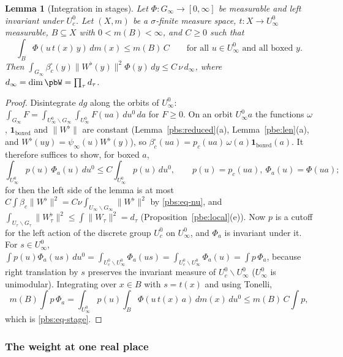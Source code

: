 \documentclass[10pt]{amsart}
\newtheorem{lemma}[theorem]{Lemma}
\theoremstyle{definition}
\theoremstyle{remark}
\begin{document}
\begin{lemma}[Integration in stages]\label{pbs:stages}
Let $\Phi\colon G_\infty\to[0,\infty]$ be measurable and left invariant under $U^0_c$. Let $(X,m)$
be a $\sigma$-finite measure space, $t\colon X\to U^0_\infty$ measurable, $B\subseteq X$ with $0<
m(B)<\infty$, and $C\ge0$ such that
\[
\int_B\Phi(u\,t(x)\,y)\,dm(x)\le m(B)\,C\qquad\text{for all }u\in U^0_\infty\text{ and all boxed }y.
\]
Then $\int_{G_\infty}\beta^\square_c(y)\|W^\flat(y)\|^2\Phi(y)\,dy\le C\,\nu\,d_\infty$, where $d_\infty=
\dim\pbW=\prod_\tau d_\tau$.
\end{lemma}
\begin{proof}
Disintegrate $dg$ along the orbits of $U^0_\infty$: $\int_{G_\infty}F=\int_{U^0_\infty\backslash G_\infty}
\int_{U^0_\infty}F(ua)\,du^0\,da$ for $F\ge0$. On an orbit $U^0_\infty a$ the functions $\omega$,
$\mathbf 1_{\text{boxed}}$ and $\|W^\flat\|$ are constant (Lemma~\ref{pbs:reduced}(a),
Lemma~\ref{pbe:len}(a), and $W^\flat(uy)=\psi_\infty(u)W^\flat(y)$), so $\beta^\square_c(ua)=p_c(ua)\,
\omega(a)\mathbf 1_{\text{boxed}}(a)$. It therefore suffices to show, for boxed $a$,
\begin{equation}\label{pbs:eq-stage}
\int_{U^0_\infty}p(u)\,\Phi_a(u)\,du^0\le C\int_{U^0_\infty}p(u)\,du^0,\qquad p(u)=p_c(ua),\ \Phi_a(u)=
\Phi(ua);
\end{equation}
for then the left side of the lemma is at most $C\int\beta_c\|W^\flat\|^2=C\nu\int_{U_\infty\backslash
G_\infty}\|W^\flat\|^2$ by \eqref{pbs:eq-nu}, and $\int_{U_\tau\backslash G_\tau}\|W^\flat_\tau\|^2\le
\int\|W_\tau\|^2=d_\tau$ (Proposition~\ref{pbe:local}(e)). Now $p$ is a cutoff for the left action of
the discrete group $U^0_c$ on $U^0_\infty$, and $\Phi_a$ is invariant under it. For $s\in U^0_\infty$,
$\int p(u)\Phi_a(us)\,du^0=\int_{U^0_c\backslash U^0_\infty}\Phi_a(us)=\int_{U^0_c\backslash U^0_\infty}
\Phi_a(u)=\int p\,\Phi_a$, because right translation by $s$ preserves the invariant measure of
$U^0_c\backslash U^0_\infty$ ($U^0_\infty$ is unimodular). Integrating over $x\in B$ with $s=t(x)$ and
using Tonelli,
\[
m(B)\int p\,\Phi_a=\int_{U^0_\infty}p(u)\int_B\Phi(u\,t(x)\,a)\,dm(x)\,du^0\le m(B)\,C\int p ,
\]
which is \eqref{pbs:eq-stage}.
\end{proof}

\subsubsection{The weight at one real place}\label{pbs:ss-oneplace}
\end{document}
